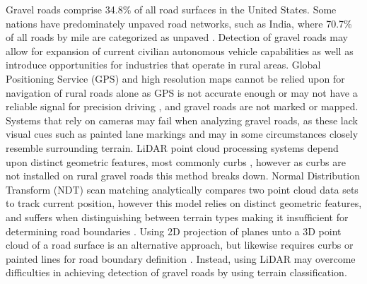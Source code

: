 \documentclass[journal,onecolumn]{IEEEtran}
\begin{document}
	{Gravel roads comprise 34.8\% \cite{road_stats_2} of all road surfaces in the United States. Some nations have predominately unpaved road networks, such as India, where 70.7\% of all roads by mile are categorized as unpaved \cite{malik_lal_2019}. Detection of gravel roads may allow for expansion of current civilian autonomous vehicle capabilities as well as introduce opportunities for industries that operate in rural areas. Global Positioning Service (GPS) and high resolution maps cannot be relied upon for navigation of rural roads alone as GPS is not accurate enough or may not have a reliable signal for precision driving \cite{noauthor_gpsgov_nodate}, and gravel roads are not marked or mapped. Systems that rely on cameras may fail when analyzing gravel roads, as these lack visual cues such as painted lane markings \cite{crisman_scarf_1993} and may in some circumstances closely resemble surrounding terrain. LiDAR point cloud processing systems depend upon distinct geometric features, most commonly curbs \cite{yadav_extraction_2017,liu_new_2013,qiu_fast_2016,fernandes_road_2014,seker_experiments_nodate,yang_semi-automated_2013,miyazaki_line-based_2014,hervieu_road_2013,smadja_road_nodate}, however as curbs are not installed on rural gravel roads \cite{skorseth_gravel_nodate} this method breaks down. Normal Distribution Transform (NDT) scan matching analytically compares two point cloud data sets to track current position, however this model relies on distinct geometric features, and suffers when distinguishing between terrain types making it insufficient for determining road boundaries \cite{biber_normal_2003}. Using 2D projection of planes unto a 3D point cloud of a road surface is an alternative approach, but likewise requires curbs or painted lines for road boundary definition \cite{fernandes_road_2014, borkar_robust_2009-1, guo_lane_2015}. Instead, using LiDAR may overcome difficulties in achieving detection of gravel roads by using terrain classification.} 
	
	

	
\end{document}
